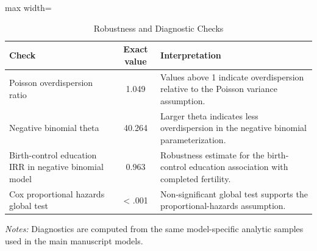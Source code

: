 \begin{table}[!htbp]
\centering
\small
\caption{Robustness and Diagnostic Checks}
\label{tab:robustness_diagnostics}
\begin{adjustbox}{max width=\textwidth}
\begin{tabular}{lcl}
\toprule
Check & Exact value & Interpretation \\
\midrule
Poisson overdispersion ratio & 1.049 & Values above 1 indicate overdispersion relative to the Poisson variance assumption. \\
Negative binomial theta & 40.264 & Larger theta indicates less overdispersion in the negative binomial parameterization. \\
Birth-control education IRR in negative binomial model & 0.963 & Robustness estimate for the birth-control education association with completed fertility. \\
Cox proportional hazards global test & < .001 & Non-significant global test supports the proportional-hazards assumption. \\
\bottomrule
\end{tabular}
\end{adjustbox}
\begin{flushleft}
\footnotesize \textit{Notes:} Diagnostics are computed from the same model-specific analytic samples used in the main manuscript models.
\end{flushleft}
\end{table}
